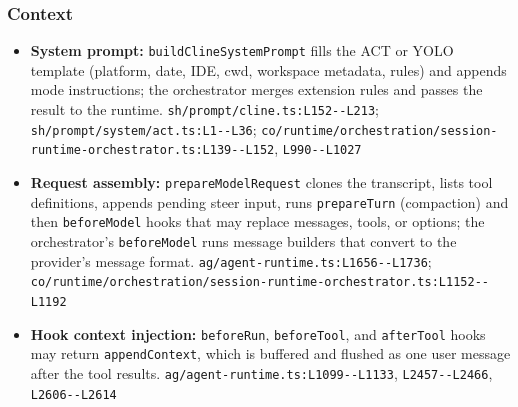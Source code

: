 \subsubsection*{Context}
\begin{itemize}
\item \textbf{System prompt:} \texttt{buildClineSystemPrompt} fills the ACT or YOLO template (platform, date, IDE, cwd, workspace metadata, rules) and appends mode instructions; the orchestrator merges extension rules and passes the result to the runtime. \texttt{sh/\allowbreak{}prompt/\allowbreak{}cline.\allowbreak{}ts:\allowbreak{}L152-\allowbreak{}-\allowbreak{}L213}; \texttt{sh/\allowbreak{}prompt/\allowbreak{}system/\allowbreak{}act.\allowbreak{}ts:\allowbreak{}L1-\allowbreak{}-\allowbreak{}L36}; \texttt{co/\allowbreak{}runtime/\allowbreak{}orchestration/\allowbreak{}session-\allowbreak{}runtime-\allowbreak{}orchestrator.\allowbreak{}ts:\allowbreak{}L139-\allowbreak{}-\allowbreak{}L152}, \texttt{L990-\allowbreak{}-\allowbreak{}L1027}
\item \textbf{Request assembly:} \texttt{prepareModelRequest} clones the transcript, lists tool definitions, appends pending steer input, runs \texttt{prepareTurn} (compaction) and then \texttt{beforeModel} hooks that may replace messages, tools, or options; the orchestrator's \texttt{beforeModel} runs message builders that convert to the provider's message format. \texttt{ag/\allowbreak{}agent-\allowbreak{}runtime.\allowbreak{}ts:\allowbreak{}L1656-\allowbreak{}-\allowbreak{}L1736}; \texttt{co/\allowbreak{}runtime/\allowbreak{}orchestration/\allowbreak{}session-\allowbreak{}runtime-\allowbreak{}orchestrator.\allowbreak{}ts:\allowbreak{}L1152-\allowbreak{}-\allowbreak{}L1192}
\item \textbf{Hook context injection:} \texttt{beforeRun}, \texttt{beforeTool}, and \texttt{afterTool} hooks may return \texttt{appendContext}, which is buffered and flushed as one user message after the tool results. \texttt{ag/\allowbreak{}agent-\allowbreak{}runtime.\allowbreak{}ts:\allowbreak{}L1099-\allowbreak{}-\allowbreak{}L1133}, \texttt{L2457-\allowbreak{}-\allowbreak{}L2466}, \texttt{L2606-\allowbreak{}-\allowbreak{}L2614}

\end{itemize}
